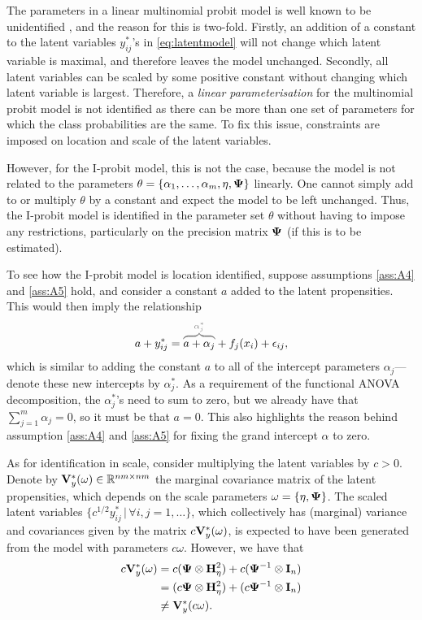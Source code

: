 The parameters in a linear multinomial probit model is well known to be unidentified \citep{Keane1992,train2009discrete}, and the reason for this is two-fold.
Firstly, an addition of a constant to the latent variables $y_{ij}^*$'s in \cref{eq:latentmodel} will not change which latent variable is maximal, and therefore leaves the model unchanged.
Secondly, all latent variables can be scaled by some positive constant without changing which latent variable is largest.
Therefore, a \emph{linear parameterisation} for the multinomial probit model is not identified as there can be more than one set of parameters for which the class probabilities are the same.
To fix this issue, constraints are imposed on location and scale of the latent variables.

However, for the I-probit model, this is not the case, because the model is not related to the parameters $\theta = \{\alpha_1,\dots,\alpha_m,\eta, {\bm\Psi} \}$ linearly.
One cannot simply add to or multiply $\theta$ by a constant and expect the model to be left unchanged.
Thus, the I-probit model is identified in the parameter set $\theta$ without having to impose any restrictions, particularly on the precision matrix ${\bm\Psi}$ (if this is to be estimated).

To see how the I-probit model is location identified, suppose assumptions \ref{ass:A4} and \ref{ass:A5} hold, and consider a constant $a$ added to the latent propensities.
This would then imply the relationship
\[
  a + y_{ij}^* = 
  \greyoverbrace{a + \alpha_j}{\alpha_j^*}  + f_j(x_i) + \epsilon_{ij},
\]
which is similar to adding the constant $a$ to all of the intercept parameters $\alpha_j$---denote these new intercepts by $\alpha_j^*$.
As a requirement of the functional ANOVA decomposition, the $\alpha_j^*$'s need to sum to zero, but we already have that $\sum_{j=1}^m \alpha_j=0$, so it must be that $a =0$.
This also highlights the reason behind assumption \ref{ass:A4} and \ref{ass:A5} for fixing the grand intercept $\alpha$ to zero.

As for identification in scale, consider multiplying the latent variables by $c>0$.
Denote by ${\mathbf V}_y^*(\omega) \in \mathbb{R}^{nm \times nm}$ the marginal covariance matrix of the latent propensities, which depends on the scale parameters $\omega = \{\eta, {\bm\Psi}\}$.
The scaled latent variables $\{c^{1/2}y^*_{ij} \,|\, \forall i,j = 1,\dots \}$, which collectively has (marginal) variance and covariances given by the matrix $c {\mathbf V}_y^*(\omega)$, is expected to have been generated from the model with parameters $c\omega$.
However, we have that 
\begin{align*}
  c{\mathbf V}_y^*(\omega)
  &= c ({\bm\Psi} \otimes {\mathbf H}_\eta^2) + c ({\bm\Psi}^{-1} \otimes {\mathbf I}_n) \\
  &= (c {\bm\Psi} \otimes {\mathbf H}_\eta^2) + (c {\bm\Psi}^{-1} \otimes {\mathbf I}_n) \\
  &\neq {\mathbf V}_y^*(c\omega).
\end{align*}

